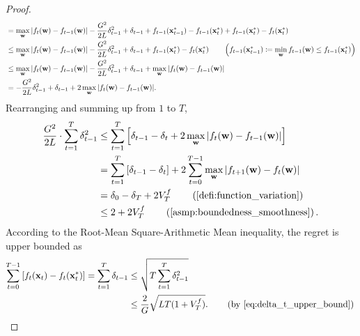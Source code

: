 \begin{proof}
\begin{equation*}
\begin{split}
    &= \max\limits_{{\mathbf{w}}}{\left| f_{t}({\mathbf{w}}) - f_{t-1}({\mathbf{w}}) \right| } - \frac{G^2}{2L} \delta_{t-1}^2 + \delta_{t-1} + f_{t-1}({\mathbf{x}}_{t-1}^*) - f_{t-1}({\mathbf{x}}_{t}^*) + f_{t-1}({\mathbf{x}}_{t}^*) - f_t( {\mathbf{x}}_t^*) \\
    &\le \max\limits_{{\mathbf{w}}}{\left| f_{t}({\mathbf{w}}) - f_{t-1}({\mathbf{w}}) \right| } - \frac{G^2}{2L} \delta_{t-1}^2 + \delta_{t-1} + f_{t-1}({\mathbf{x}}_{t}^*) - f_t( {\mathbf{x}}_t^*) \qquad \left(f_{t-1}({\mathbf{x}}_{t-1}^*) \coloneqq \min\limits_{{\mathbf{w}}}{f_{t-1}({\mathbf{w}})} \le f_{t-1}({\mathbf{x}}_t^*) \right) \\
    &\le \max\limits_{{\mathbf{w}}}{\left| f_{t}({\mathbf{w}}) - f_{t-1}({\mathbf{w}}) \right| } - \frac{G^2}{2L} \delta_{t-1}^2 + \delta_{t-1} + \max\limits_{{\mathbf{w}}}{\left| f_{t}({\mathbf{w}}) - f_{t-1}({\mathbf{w}}) \right| } \\
    &= - \frac{G^2}{2L} \delta_{t-1}^2 + \delta_{t-1} + 2 \max\limits_{{\mathbf{w}}}{\left| f_{t}({\mathbf{w}}) - f_{t-1}({\mathbf{w}}) \right| }.
\end{split}
\end{equation*}
Rearranging and summing up from $1$ to $T$,
\begin{equation}
\label{eq:delta_t_upper_bound}
\begin{split}
    \frac{G^2}{2L} \cdot \sum\limits_{t=1}^{T}{ \delta_{t-1}^2} &\le \sum\limits_{t=1}^{T}{\left[ \delta_{t-1} - \delta_{t} + 2 \max\limits_{\rvw}{\left| f_{t}(\rvw) - f_{t-1}(\rvw) \right|} \right] } \\
    &= \sum\limits_{t=1}^{T}{ \left[ \delta_{t-1} - \delta_{t} \right] } + 2 \sum\limits_{t=0}^{T-1}{ \max\limits_{\rvw}{\left| f_{t+1}(\rvw) - f_{t}(\rvw) \right| } } \\
    &= \delta_0 - \delta_{T} + 2 V_T^f \qquad \left( \text{\cref{defi:function_variation}} \right) \\
    &\le 2 + 2 V_T^f \qquad \left(\text{\cref{asmp:boundedness_smoothness}}\right).
\end{split}
\end{equation}
According to the Root-Mean Square-Arithmetic Mean inequality, the regret is upper bounded as
\begin{equation*}
\begin{split}
    \sum\limits_{t=0}^{T-1}{\left[ f_t(\rvx_t) - f_t( \rvx_t^*) \right]} = \sum\limits_{t=1}^{T}{ \delta_{t-1}} &\le \sqrt{T \sum\limits_{t=1}^{T}{ \delta_{t-1}^2}} \\
    &\le \frac{2}{G} \sqrt{L T ( 1 + V_T^f)}. \qquad \left(\text{by \cref{eq:delta_t_upper_bound}}\right) \qedhere
\end{split}
\end{equation*}
\end{proof}